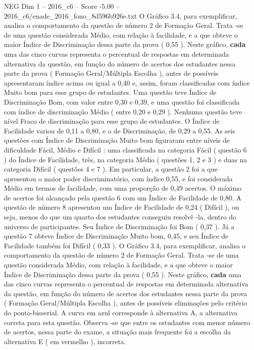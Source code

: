 \begin{textsample}{NEG Dim 1 – 2016\_c6 – Score -5.00 – 2016\_c6/enade\_2016\_fono\_8d596b926e.txt}
O Gráfico 3.4, para exemplificar, analisa o comportamento da questão de número 2 de Formação Geral.
Trata -se de uma questão considerada Médio, com relação à facilidade, e a que obteve o maior Índice de Discriminação dessa parte da prova ( 0,55 ).
Neste gráfico, \textbf{cada} uma das cinco curvas representa o percentual de respostas em determinada alternativa da questão, em função do número de acertos dos estudantes nessa parte da prova ( Formação Geral/Múltipla Escolha ), antes de possíveis apresentaram índice acima ou igual a 0,40 e, assim, foram classificadas com índice Muito bom para esse grupo de estudantes.
Uma questão teve Índice de Discriminação Bom, com valor entre 0,30 e 0,39, e uma questão foi classificada com índice de discriminação Médio ( entre 0,20 e 0,29 ).
Nenhuma questão teve nível Fraco de discriminação para esse grupo de estudantes.
O Índice de Facilidade variou de 0,11 a 0,80, e o de Discriminação, de 0,29 a 0,55.
As seis questões com Índice de Discriminação Muito bom figuraram entre níveis de dificuldade Fácil, Médio e Difícil : uma classificada na categoria Fácil ( questão 6 ) do Índice de Facilidade, três, na categoria Médio ( questões 1, 2 e 3 ) e duas na categoria Difícil ( questões 4 e 7 ).
Em particular, a questão 2 foi a que apresentou o maior poder discriminatório, com índice 0,55, e foi considerada Médio em termos de facilidade, com uma proporção de 0,49 acertos.
O máximo de acertos foi alcançado pela questão 6 com um Índice de Facilidade de 0,80.
A questão de número 8 apresentou um Índice de Facilidade de 0,24 ( Difícil ), ou seja, menos do que um quarto dos estudantes conseguiu resolvê -la, dentro do universo de participantes.
Seu Índice de Discriminação foi Bom ( 0,37 ).
Já a questão 7 obteve Índice de Discriminação Muito bom, 0,45, e seu Índice de Facilidade também foi Difícil ( 0,33 ).
O Gráfico 3.4, para exemplificar, analisa o comportamento da questão de número 2 de Formação Geral.
Trata -se de uma questão considerada Médio, com relação à facilidade, e a que obteve o maior Índice de Discriminação dessa parte da prova ( 0,55 ).
Neste gráfico, \textbf{cada} uma das cinco curvas representa o percentual de respostas em determinada alternativa da questão, em função do número de acertos dos estudantes nessa parte da prova ( Formação Geral/Múltipla Escolha ), antes de possíveis eliminações pelo critério do ponto-bisserial.
A curva em azul corresponde à alternativa A, a alternativa correta para esta questão.
Observa -se que entre os estudantes com menor número de acertos, nessa parte do exame, a situação mais frequente foi a escolha da alternativa E ( em vermelho ), incorreta.

\end{textsample}
